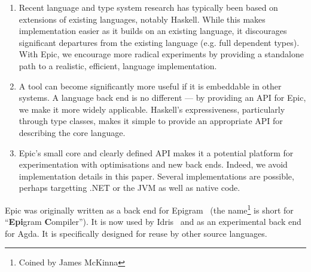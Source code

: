 \begin{enumerate}
\item Recent language and type system research has typically been
  based on extensions of existing languages, notably Haskell. While
  this makes implementation easier as it builds on an existing
  language, it discourages significant departures from the existing
  language (e.g. full dependent types). With Epic, we encourage
  more radical experiments by providing a standalone path to a realistic,
  efficient, language implementation.
\item A tool can become significantly more useful if it is embeddable in
  other systems. A language back end is no different --- by providing
  an API for Epic, we make it more widely applicable. Haskell's
  expressiveness, particularly through type classes, makes it simple
  to provide an appropriate API for describing the core language.
\item Epic's small core and clearly defined API makes it a potential
  platform for experimentation with optimisations and new back
  ends. Indeed, we avoid implementation details in
  this paper. Several implementations are possible, perhaps targetting
  .NET or the JVM as well as native code.
\end{enumerate}

\noindent
Epic was originally written as a back end for
Epigram~\cite{levitation} (the name\footnote{Coined by James McKinna}
is short for ``\textbf{Epi}gram \textbf{C}ompiler''). It is now used
by Idris~\cite{plpv11} and as an experimental back end for
Agda. It is specifically designed for reuse by other source languages.





